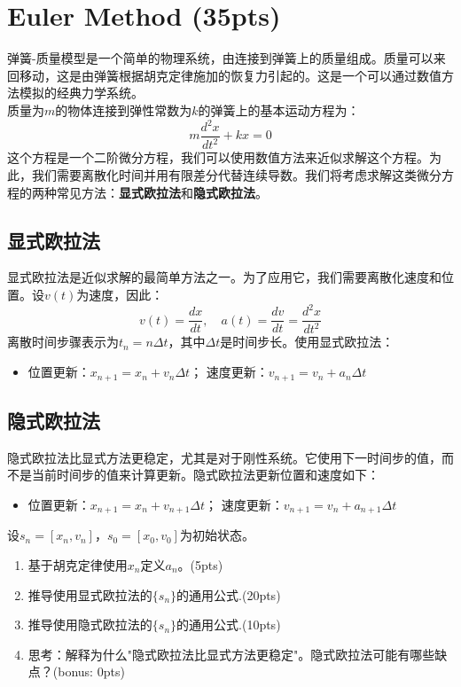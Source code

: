 \section{Euler Method (35pts)}
弹簧-质量模型是一个简单的物理系统，由连接到弹簧上的质量组成。质量可以来回移动，这是由弹簧根据胡克定律施加的恢复力引起的。这是一个可以通过数值方法模拟的经典力学系统。\\
质量为$m$的物体连接到弹性常数为$k$的弹簧上的基本运动方程为：
\[
m \frac{d^2x}{dt^2} + kx = 0
\]
这个方程是一个二阶微分方程，我们可以使用数值方法来近似求解这个方程。为此，我们需要离散化时间并用有限差分代替连续导数。我们将考虑求解这类微分方程的两种常见方法：\textbf{显式欧拉法}和\textbf{隐式欧拉法}。
\subsection*{显式欧拉法}
显式欧拉法是近似求解的最简单方法之一。为了应用它，我们需要离散化速度和位置。设$v(t)$为速度，因此：
\[
v(t) = \frac{dx}{dt}, \quad a(t) = \frac{dv}{dt} = \frac{d^2x}{dt^2}
\]
离散时间步骤表示为$t_n = n \Delta t$，其中$\Delta t$是时间步长。使用显式欧拉法：
\begin{itemize}
	\item 位置更新：$x_{n+1} = x_n + v_n \Delta t$；    速度更新：$v_{n+1} = v_n + a_n \Delta t$
\end{itemize}
\subsection*{隐式欧拉法}
隐式欧拉法比显式方法更稳定，尤其是对于刚性系统。它使用下一时间步的值，而不是当前时间步的值来计算更新。隐式欧拉法更新位置和速度如下：
\begin{itemize}
	\item 位置更新：$x_{n+1} = x_n + v_{n+1} \Delta t$；    速度更新：$v_{n+1} = v_n + a_{n+1} \Delta t$
\end{itemize}
设$s_n = [x_n, v_n]$，$s_0 = [x_0, v_0]$为初始状态。
\begin{enumerate}
	\item 基于胡克定律使用$x_n$定义$a_n$。(5pts)
	\item 推导使用显式欧拉法的$\{s_n\}$的通用公式.(20pts)
	\item 推导使用隐式欧拉法的$\{s_n\}$的通用公式.(10pts)
	\item 思考：解释为什么"隐式欧拉法比显式方法更稳定"。隐式欧拉法可能有哪些缺点？(bonus: 0pts)
\end{enumerate}
